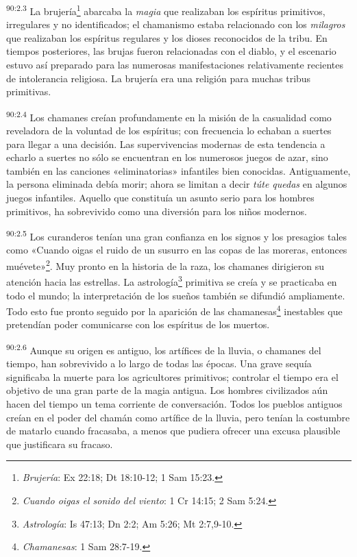 \par
\textsuperscript{90:2.3} La brujería\footnote{\textit{Brujería}: Ex 22:18; Dt 18:10-12; 1 Sam 15:23.} abarcaba la \textit{magia} que realizaban los espíritus primitivos, irregulares y no identificados; el chamanismo estaba relacionado con los \textit{milagros} que realizaban los espíritus regulares y los dioses reconocidos de la tribu. En tiempos posteriores, las brujas fueron relacionadas con el diablo, y el escenario estuvo así preparado para las numerosas manifestaciones relativamente recientes de intolerancia religiosa. La brujería era una religión para muchas tribus primitivas.

\par
\textsuperscript{90:2.4} Los chamanes creían profundamente en la misión de la casualidad como reveladora de la voluntad de los espíritus; con frecuencia lo echaban a suertes para llegar a una decisión. Las supervivencias modernas de esta tendencia a echarlo a suertes no sólo se encuentran en los numerosos juegos de azar, sino también en las canciones «eliminatorias» infantiles bien conocidas. Antiguamente, la persona eliminada debía morir; ahora se limitan a decir \textit{túte quedas} en algunos juegos infantiles. Aquello que constituía un asunto serio para los hombres primitivos, ha sobrevivido como una diversión para los niños modernos.

\par
\textsuperscript{90:2.5} Los curanderos tenían una gran confianza en los signos y los presagios tales como «Cuando oigas el ruido de un susurro en las copas de las moreras, entonces muévete»\footnote{\textit{Cuando oigas el sonido del viento}: 1 Cr 14:15; 2 Sam 5:24.}. Muy pronto en la historia de la raza, los chamanes dirigieron su atención hacia las estrellas. La astrología\footnote{\textit{Astrología}: Is 47:13; Dn 2:2; Am 5:26; Mt 2:7,9-10.} primitiva se creía y se practicaba en todo el mundo; la interpretación de los sueños también se difundió ampliamente. Todo esto fue pronto seguido por la aparición de las chamanesas\footnote{\textit{Chamanesas}: 1 Sam 28:7-19.} inestables que pretendían poder comunicarse con los espíritus de los muertos.

\par
\textsuperscript{90:2.6} Aunque su origen es antiguo, los artífices de la lluvia, o chamanes del tiempo, han sobrevivido a lo largo de todas las épocas. Una grave sequía significaba la muerte para los agricultores primitivos; controlar el tiempo era el objetivo de una gran parte de la magia antigua. Los hombres civilizados aún hacen del tiempo un tema corriente de conversación. Todos los pueblos antiguos creían en el poder del chamán como artífice de la lluvia, pero tenían la costumbre de matarlo cuando fracasaba, a menos que pudiera ofrecer una excusa plausible que justificara su fracaso.

